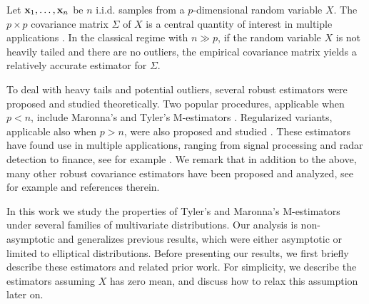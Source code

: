 \documentclass[times,sort&compress,3p]{elsarticle}
\begin{document}
         
         
         
 Let ${\bf x}_1,\ldots,{\bf x}_n$ be $n$ i.i.d. samples from a $p$-dimensional random variable $X$. 
 The $p\times p$ covariance matrix $\Sigma$ of $X$ is a central quantity of interest in multiple applications \cite{anderson,muirhead2009aspects}. In the classical regime with $n\gg p$,  if the random variable $X$ is not heavily tailed and there are no outliers, the empirical covariance matrix yields a relatively accurate estimator for $\Sigma$. 

To deal with heavy tails and potential outliers, 
several robust estimators were proposed and studied theoretically. Two popular procedures, applicable when $p<n$, include Maronna's and Tyler's M-estimators \cite{maronna1976robust,tyler1987distribution}.
Regularized variants, applicable also when $p>n$,
were also proposed and studied \cite{abramovich,ollila2014regularized,chen,pascal}. These estimators have 
found use in multiple applications, ranging from signal processing and radar detection to finance, see for example
\cite{couillet2014large,pascal,ollila2014regularized}.
We remark that in addition to the above, many other robust covariance estimators have been proposed and analyzed, see for example
\cite{hubert2008high,wiesel2015structured,dumbgen2016new, maronna2019robust,catoni2016pac,chen2018robust,ke2019user,minsker2022robust,mendelson2020robust,diakonikolas2019recent}
and references therein. 

In this work we study the properties of 
Tyler's and Maronna's M-estimators under 
several families of multivariate distributions. Our analysis is non-asymptotic and generalizes previous results, which were either asymptotic or limited to elliptical distributions. Before presenting our results, we first briefly describe these estimators and related prior work. For simplicity, 
we describe the estimators assuming 
$X$ has zero mean, and discuss how to relax this assumption later on. 
\end{document}
